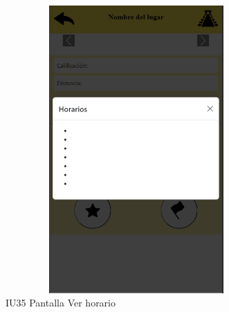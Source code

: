 \begin{figure}[htb]
    \begin{minipage}{1\textwidth}
    \centering
    \includegraphics[width=10cm, height=11cm]{entregable final/pantallasSistema/IU35 Pantalla Ver horario.png}
    \caption{IU35 Pantalla Ver horario}
\end{minipage}

\end{figure}
